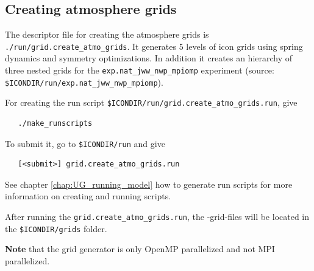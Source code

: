 \subsection{Creating atmosphere grids}

The descriptor file for creating the atmosphere grids is \verb+./run/grid.create_atmo_grids+. It generates 5 levels of icon grids using spring dynamics and symmetry optimizations. In addition it creates an hierarchy of three nested grids for the \verb+exp.nat_jww_nwp_mpiomp+ experiment (source: \verb+$ICONDIR/run/exp.nat_jww_nwp_mpiomp+).

For creating the run script \verb+$ICONDIR/run/grid.create_atmo_grids.run+, give

\begin{small}
  \begin{verbatim}
   ./make_runscripts
  \end{verbatim}
\end{small}

To submit it, go to \verb+$ICONDIR/run+ and give

\begin{small}
  \begin{verbatim}
   [<submit>] grid.create_atmo_grids.run 
  \end{verbatim}
\end{small}

See chapter \ref{chap:UG_running_model} how to generate run scripts for more information on creating and running scripts.

After running the \verb+grid.create_atmo_grids.run+, the \netcdf -grid-files will be located in the \verb+$ICONDIR/grids+ folder.

\textbf{Note} that the grid generator is only OpenMP parallelized and not MPI parallelized.


%
%
%



